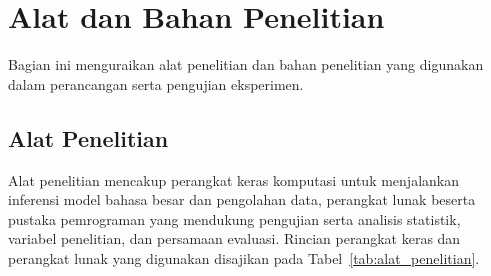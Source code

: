 \section{Alat dan Bahan Penelitian}

Bagian ini menguraikan alat penelitian dan bahan penelitian yang digunakan dalam perancangan serta pengujian eksperimen.

\subsection{Alat Penelitian}

Alat penelitian mencakup perangkat keras komputasi untuk menjalankan inferensi model bahasa besar dan pengolahan data, perangkat lunak beserta pustaka pemrograman yang mendukung pengujian serta analisis statistik, variabel penelitian, dan persamaan evaluasi. Rincian perangkat keras dan perangkat lunak yang digunakan disajikan pada Tabel~\ref{tab:alat_penelitian}.

